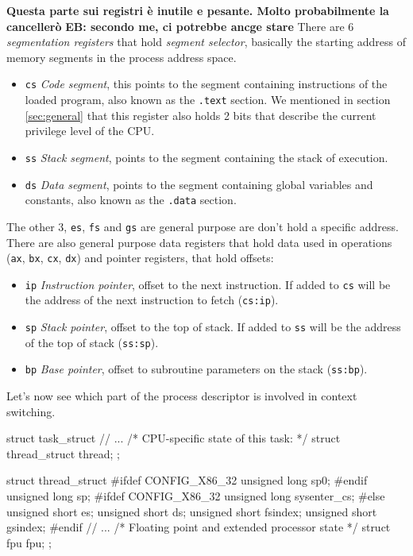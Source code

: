 \documentclass[10pt]{book}
\newcommand{\mycomment}[1]{\textbf{#1}}  %
\begin{document}
\textbf{Questa parte sui registri è inutile e pesante. Molto probabilmente la cancellerò}
\mycomment{EB: secondo me, ci potrebbe ancge stare}
There are 6 \textit{segmentation registers} that hold \textit{segment selector}, basically the starting address of memory segments in the process address space.
\begin{itemize}
    \item \verb|cs| \textit{Code segment}, this points to the segment containing instructions of the loaded program, also known as the \verb|.text| section. We mentioned in section \ref{sec:general} that this register also holds 2 bits that describe the current privilege level of the CPU.
    \item \verb|ss| \textit{Stack segment}, points to the segment containing the stack of execution.
    \item \verb|ds| \textit{Data segment}, points to the segment containing global variables and constants, also known as the \verb|.data| section.
\end{itemize}
The other 3, \verb|es|, \verb|fs| and \verb|gs| are general purpose are don't hold a specific address. There are also general purpose data registers that hold data used in operations (\verb|ax|, \verb|bx|, \verb|cx|, \verb|dx|) and pointer registers, that hold offsets:
\begin{itemize}
    \item \verb|ip| \textit{Instruction pointer}, offset to the next instruction. If added to \verb|cs| will be the address of the next instruction to fetch (\verb|cs:ip|).
    \item \verb|sp| \textit{Stack pointer}, offset to the top of stack. If added to \verb|ss| will be the address of the top of stack (\verb|ss:sp|).
    \item \verb|bp| \textit{Base pointer}, offset to subroutine parameters on the stack (\verb|ss:bp|).
\end{itemize}
Let's now see which part of the process descriptor is involved in context switching.
\begin{code}
struct task_struct {
    // ...
    /* CPU-specific state of this task: */
    struct thread_struct    thread;
};
\end{code}
\begin{code}
struct thread_struct {
#ifdef CONFIG_X86_32
    unsigned long	sp0;
#endif
    unsigned long	sp;
#ifdef CONFIG_X86_32
    unsigned long	sysenter_cs;
#else
    unsigned short	es;
    unsigned short	ds;
    unsigned short	fsindex;
    unsigned short        gsindex;
#endif
    // ...
    /* Floating point and extended processor state */
    struct fpu      fpu;
};
\end{code}
\end{document}
